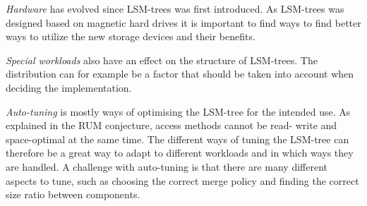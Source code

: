 \emph{Hardware} has evolved since LSM-trees was first introduced. As LSM-trees was designed based on magnetic hard drives it is important to find ways to find better ways to utilize the new storage devices and their benefits. \newline

\emph{Special workloads} also have an effect on the structure of LSM-trees. The distribution can for example be a factor that should be taken into account when deciding the implementation. \newline

\emph{Auto-tuning} is mostly ways of optimising the LSM-tree for the intended use. As explained in the RUM conjecture\cite{RUM}, access methods cannot be read- write and space-optimal at the same time. The different ways of tuning the LSM-tree can therefore be a great way to adapt to different workloads and in which ways they are handled. A challenge with auto-tuning is that there are many different aspects to tune, such as choosing the correct merge policy and finding the correct size ratio between components.
